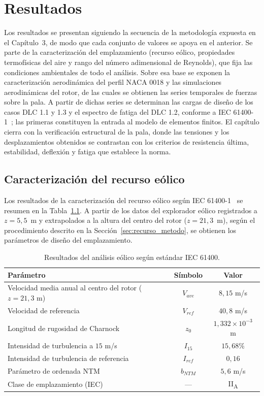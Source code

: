 \chapter{Resultados}

Los resultados se presentan siguiendo la secuencia de la metodología expuesta en el Capítulo~3, de modo que cada conjunto de valores se apoya en el anterior. Se parte de la caracterización del emplazamiento (recurso eólico, propiedades termofísicas del aire y rango del número adimensional de Reynolds), que fija las condiciones ambientales de todo el análisis. Sobre esa base se exponen la caracterización aerodinámica del perfil NACA 0018 y las simulaciones aerodinámicas del rotor, de las cuales se obtienen las series temporales de fuerzas sobre la pala. A partir de dichas series se determinan las cargas de diseño de los casos DLC 1.1 y 1.3 y el espectro de fatiga del DLC 1.2, conforme a IEC 61400-1~\parencite*{IEC61400-1}; las primeras constituyen la entrada al modelo de elementos finitos. El capítulo cierra con la verificación estructural de la pala, donde las tensiones y los desplazamientos obtenidos se contrastan con los criterios de resistencia última, estabilidad, deflexión y fatiga que establece la norma.

\section{Caracterización del recurso eólico}
\label{sec:recurso_eolico}

Los resultados de la caracterización del recurso eólico según IEC 61400-1~\parencite*{IEC61400-1} se resumen en la Tabla~\ref{tab:viento_vawt}. A partir de los datos del explorador eólico registrados a $z = 5{,}5$~m y extrapolados a la altura del centro del rotor ($z = 21{,}3$~m), según el procedimiento descrito en la Sección~\ref{sec:recurso_metodo}, se obtienen los parámetros de diseño del emplazamiento.

\begin{table}[H]
    \centering
    \caption{Resultados del análisis eólico según estándar IEC 61400.}
    \label{tab:viento_vawt}
    \begin{tabular}{lcc}
        \hline
        \textbf{Parámetro} & \textbf{Símbolo} & \textbf{Valor} \\ \hline
        Velocidad media anual al centro del rotor ($z = 21{,}3$ m) & $V_{ave}$ & $8{,}15$ m/s \\
        Velocidad de referencia & $V_{ref}$ & $40{,}8$ m/s \\
        Longitud de rugosidad de Charnock & $z_0$ & $1{,}332 \times 10^{-3}$ m \\
        Intensidad de turbulencia a $15$ m/s & $I_{15}$ & $15{,}68\%$ \\
        Intensidad de turbulencia de referencia & $I_{ref}$ & $0{,}16$ \\
        Parámetro de ordenada NTM & $b_{NTM}$ & $5{,}6$ m/s \\
        Clase de emplazamiento (IEC) & --- & II\textsubscript{A} \\ \hline
    \end{tabular}
\end{table}

